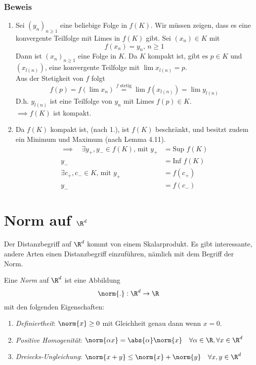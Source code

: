 \subsubsection*{Beweis}
\begin{enumerate}
\item Sei $(y_{n})_{n\geq 1}$ eine beliebige Folge in $f(K)$. Wir müssen zeigen, dass es eine konvergente Teilfolge mit Limes in $f(K)$ gibt. Sei $(x_{n}) \in K$ mit \[ f(x_{n}) = y_{n},\, n\geq 1\]
Dann ist $(x_{n})_{n\geq 1}$ eine Folge in $K$. Da $K$ kompakt ist, gibt es $p \in K$ und $(x_{l(n)})$, eine konvergente Teilfolge mit $\lim{x_{l(n)}} =p$. \\
Aus der Stetigkeit von $f$ folgt \[ f(p) = f(\lim{x_{n}}) \overset{f\text{ stetig}}= \lim{f(x_{l(n)})} = \lim{y_{l(n)}}\]
D.h. $y_{l(n)}$ ist eine Teilfolge von $y_{n}$ mit Limes $f(p) \in K$. \\
$\implies f(K)$ ist kompakt.
\item Da $f(K)$ kompakt ist, (nach 1.), ist $f(K)$ beschränkt, und besitzt zudem ein Minimum und Maximum (nach Lemma 4.11). \\
\begin{align*}\implies \quad \exists y_{+}, y_{-}\in f(K)\text{, mit } y_{+} &= \text{Sup } f(K) \\ y_{-} &= \text{Inf } f(K) \\
\exists c_{+}, c_{-} \in K \text{, mit } y_{+} &= f(c_{+}) \\ y_{-} &= f(c_{-}) \end{align*}
\end{enumerate}

\section{Norm auf $\R^{d}$}
Der Distanzbegriff auf $\R^{d}$ kommt von einem Skalarprodukt. Es gibt interessante, andere Arten einen Distanzbegriff einzuführen, nämlich mit dem Begriff der Norm.

\begin{definition}{4.13}
Eine \emph{Norm} auf $\R^{d}$ ist eine Abbildung \[ \norm{.}: \R^{d} \to \R \] mit den folgenden Eigenschaften:
\begin{enumerate}
\item \emph{Definiertheit}: $\norm{x} \geq 0$ mit Gleichheit genau dann wenn $x=0$.
\item \emph{Positive Homogenität}: $\norm{\alpha x} = \abs{\alpha}\norm{x} \quad \forall \alpha \in \R, \forall x \in \R^{d}$
\item \emph{Dreiecks-Ungleichung}: $\norm{x+y} \leq \norm{x} + \norm{y} \quad \forall x,y \in \R^{d}$
\end{enumerate}
\end{definition}

